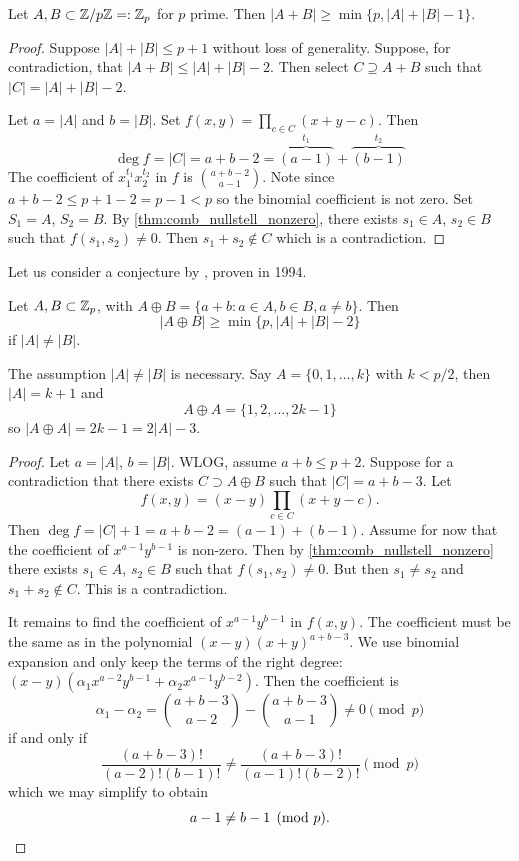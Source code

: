 \begin{theorem*}
Let $A,B \subset \mathbb{Z}/ p\mathbb{Z} =: \mathbb{Z}_p$ for $p$ prime. Then $|A+B| \geq \min\{ p, |A|+|B|-1\}$.
\end{theorem*}
\begin{proof}	
Suppose $|A|+|B| \leq p+1$ without loss of generality. Suppose, for contradiction, that $|A+B| \leq |A|+|B|- 2$. Then select $C\supseteq A+B$ such that $|C| = |A| + |B| - 2$.

Let $a= |A|$ and $b=|B|$. Set $f(x,y) = \prod_{c\in C} (x+y-c)$. Then 
\[
\deg f = |C| = a+b-2 = \overbrace{(a-1)}^{t_1} + \overbrace{(b-1)}^{t_2}
\]
The coefficient of $x_1^{t_1}x_2^{t_2}$ in $f$ is ${a+b-2\choose a-1}$. Note since $a+b-2 \leq p+1-2 = p-1 < p$ so the binomial coefficient is not zero. Set $S_1= A$, $S_2=B$. By \cref{thm:comb_nullstell_nonzero}, there exists $s_1\in A$, $s_2\in B$ such that $f(s_1,s_2) \neq 0$. Then $s_1+s_2\not\in C$ which is a contradiction.
\end{proof}

Let us consider a conjecture by \cite{ErdosHeilbronn}, proven in 1994. 
\begin{theorem}
Let $A,B\subset \mathbb{Z}_p$, with $A\oplus B = \{a+b: a\in A, b\in B, a\neq b\}$. Then
\[
|A\oplus B| \geq \min \{p, |A| +|B|-2 \}
\]
if $|A|\neq |B|$.
\end{theorem}
\begin{remark}
The assumption $|A|\neq|B|$ is necessary. Say $A= \{0,1,\dotsc,k\}$ with $k< p/2$, then $|A| = k+1$ and
\[
A\oplus A = \{1,2,\dotsc,2k-1 \}
\]
so $|A\oplus A| = 2k-1 = 2|A|-3$.
\end{remark}
\begin{proof}	
Let $a=|A|$, $b=|B|$. WLOG, assume $a+b\leq p+2$. Suppose for a contradiction that  there exists $C \supset A\oplus B$ such that $|C| = a+b-3$. Let 
\[
f(x,y) = (x-y)\prod_{c\in C} (x+y-c).
\]
Then $\deg f = |C|+1 = a+b-2 = (a-1) + (b-1)$. Assume for now that the coefficient of $x^{a-1}y^{b-1}$ is non-zero. Then by \cref{thm:comb_nullstell_nonzero} there exists $s_1\in A$, $s_2\in B$ such that $f(s_1,s_2) \neq 0$. But then $s_1\neq s_2$ and $s_1+s_2\not \in C$. This is a contradiction.

It remains to find the coefficient of $x^{a-1}y^{b-1}$ in $f(x,y)$. The coefficient must be the same as in the polynomial $(x-y)(x+y)^{a+b-3}$. We use binomial expansion and only keep the terms of the right degree: $(x-y) (\alpha_1 x^{a-2}y^{b-1} +  \alpha_2  x^{a-1} y^{b-2})$. Then the coefficient is
\[
\alpha_1 - \alpha_2 = {a+b-3 \choose a-2} - {a+b-3 \choose a-1} \neq 0 \pmod{p}
\]
if and only if
\[
\frac{(a+b-3)!}{(a-2)!(b-1)!} \neq \frac{(a+b-3)!}{(a-1)!(b-2)!} \pmod{p}
\]
which we may simplify to obtain
\[
a-1 \neq b-1 \pmod{p}.\qedhere
\]
\end{proof}


